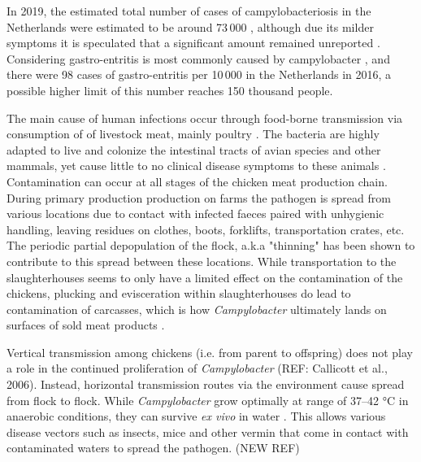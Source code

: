 In 2019, the estimated total number of cases of campylobacteriosis in the Netherlands were estimated to be around 73\,000 \parencite{lagerweij_disease_2020}, although due its milder symptoms it is speculated that a significant amount remained unreported \parencite{koutsoumanis_update_2020}. Considering gastro-entritis is most commonly caused by campylobacter \parencite{fouts_major_2005}, and there were 98 cases of gastro-entritis per 10\,000 in the Netherlands in 2016, a possible higher limit of this number reaches 150 thousand people.


The main cause of human infections occur through food-borne transmission via consumption of of livestock meat, mainly poultry \parencite{wilson_tracing_2008}. The bacteria are highly adapted to live and colonize the intestinal tracts of avian species and other mammals, yet cause little to no clinical disease symptoms to these animals \parencite{saif_diseases_2008}. Contamination can occur at all stages of the chicken meat production chain. During primary production production on farms the pathogen is spread from various locations due to contact with infected faeces paired with unhygienic handling, leaving residues on clothes, boots, forklifts, transportation crates, etc. The periodic partial depopulation of the flock, a.k.a "thinning" has been shown to contribute to this spread between these locations. While transportation to the slaughterhouses seems to only have a limited effect on the contamination of the chickens, plucking and  evisceration within slaughterhouses do lead to contamination of carcasses, which is how \textit{Campylobacter} ultimately lands on surfaces of sold meat products \parencite{skarp_campylobacteriosis_2015}.

Vertical transmission among chickens (i.e. from parent to offspring) does not play a role in the continued
proliferation of \textit{Campylobacter} (REF: Callicott et al., 2006). Instead, horizontal transmission routes via the environment cause spread from flock to flock. While \textit{Campylobacter} grow optimally at range of 37–42 °C  in anaerobic conditions, they can survive \textit{ex vivo} in water \cite{wilson_tracing_2008}. This allows various disease vectors such as insects, mice and other vermin that come in contact with contaminated waters to spread the pathogen. (NEW REF)

